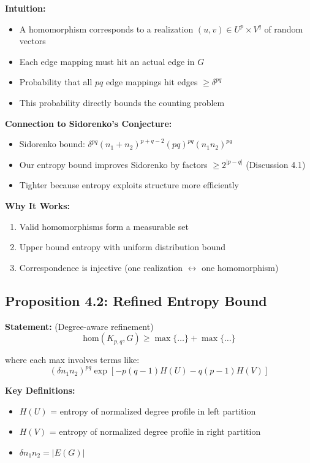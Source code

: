 \documentclass[12pt,a4paper]{article}
\begin{document}
\textbf{Intuition:}
\begin{itemize}
    \item A homomorphism corresponds to a realization $(u,v) \in U^p \times V^q$ of random vectors
    \item Each edge mapping must hit an actual edge in $G$
    \item Probability that all $pq$ edge mappings hit edges $\geq \delta^{pq}$
    \item This probability directly bounds the counting problem
\end{itemize}

\textbf{Connection to Sidorenko's Conjecture:}
\begin{itemize}
    \item Sidorenko bound: $\delta^{pq}(n_1+n_2)^{p+q-2} (pq)^{pq}(n_1 n_2)^{pq}$
    \item Our entropy bound improves Sidorenko by factors $\geq 2^{|p-q|}$ (Discussion 4.1)
    \item Tighter because entropy exploits structure more efficiently
\end{itemize}

\textbf{Why It Works:}
\begin{enumerate}
    \item Valid homomorphisms form a measurable set
    \item Upper bound entropy with uniform distribution bound
    \item Correspondence is injective (one realization $\leftrightarrow$ one homomorphism)
\end{enumerate}

\subsection{Proposition 4.2: Refined Entropy Bound}

\textbf{Statement:} (Degree-aware refinement)
\[
\text{hom}(K_{p,q}, G) \geq \max\{\ldots\} + \max\{\ldots\}
\]

where each max involves terms like:
\[
(\delta n_1 n_2)^{pq} \exp[-p(q-1)H(U) - q(p-1)H(V)]
\]

\textbf{Key Definitions:}
\begin{itemize}
    \item $H(U)$ = entropy of normalized degree profile in left partition
    \item $H(V)$ = entropy of normalized degree profile in right partition
    \item $\delta n_1 n_2 = |E(G)|$
\end{itemize}
\end{document}
